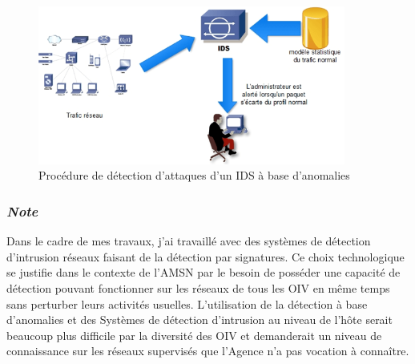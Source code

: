 \begin{figure}[h]%
    \center%
    \includegraphics[width=0.9\textwidth]{assets/IDSbaseAnomalies.png}
    \caption[Procédure de détection d’attaques d’un IDS à base d’anomalies (source: \href{https://techno-skills.com/wp-content/uploads/2020/12/image-5.png}{techno-skills.com})]{Procédure de détection d’attaques d’un IDS à base d’anomalies}\label{fig:ids-anomalie}
\end{figure}

\subsubsection{\textit{Note}}
Dans le cadre de mes travaux, j'ai travaillé avec des systèmes de détection d'intrusion réseaux faisant de la détection par signatures. Ce choix technologique se justifie dans le contexte de l'AMSN par le besoin de posséder une capacité de détection pouvant fonctionner sur les réseaux de tous les OIV en même temps sans perturber leurs activités usuelles. L'utilisation de la détection à base d’anomalies et des Systèmes de détection d’intrusion au niveau de l’hôte serait beaucoup plus difficile par la diversité des OIV et demanderait un niveau de connaissance sur les réseaux supervisés que l'Agence n'a pas vocation à connaître.